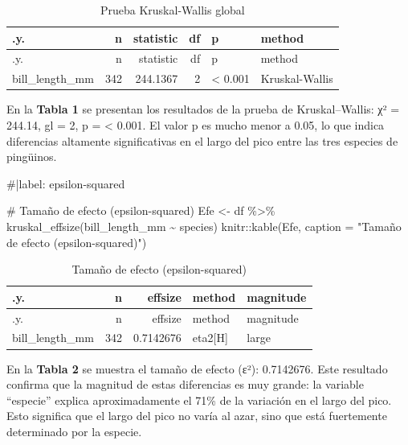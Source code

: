 \documentclass[
  spanish,
  11pt,
  a4paper,
  DIV=11,
  numbers=noendperiod]{scrartcl}
\newenvironment{Shaded}{\begin{snugshade}}{\end{snugshade}}
\newcommand{\AttributeTok}[1]{\textcolor[rgb]{0.40,0.45,0.13}{#1}}
\newcommand{\CommentTok}[1]{\textcolor[rgb]{0.37,0.37,0.37}{#1}}
\newcommand{\FunctionTok}[1]{\textcolor[rgb]{0.28,0.35,0.67}{#1}}
\newcommand{\NormalTok}[1]{\textcolor[rgb]{0.00,0.23,0.31}{#1}}
\newcommand{\OtherTok}[1]{\textcolor[rgb]{0.00,0.23,0.31}{#1}}
\newcommand{\SpecialCharTok}[1]{\textcolor[rgb]{0.37,0.37,0.37}{#1}}
\newcommand{\StringTok}[1]{\textcolor[rgb]{0.13,0.47,0.30}{#1}}
\begin{document}
\begin{longtable}[]{@{}lrrrll@{}}
\caption{Prueba Kruskal-Wallis global}\tabularnewline
\toprule\noalign{}
.y. & n & statistic & df & p & method \\
\midrule\noalign{}
\endfirsthead
\toprule\noalign{}
.y. & n & statistic & df & p & method \\
\midrule\noalign{}
\endhead
\bottomrule\noalign{}
\endlastfoot
bill\_length\_mm & 342 & 244.1367 & 2 & \textless{} 0.001 &
Kruskal-Wallis \\
\end{longtable}

En la \textbf{Tabla 1} se presentan los resultados de la prueba de
Kruskal--Wallis: χ² = 244.14, gl = 2, p = \textless{} 0.001. El valor p
es mucho menor a 0.05, lo que indica diferencias altamente
significativas en el largo del pico entre las tres especies de
pingüinos.

\begin{Shaded}
\begin{Highlighting}[numbers=left,,]
\CommentTok{\#|label: epsilon{-}squared}

\CommentTok{\# Tamaño de efecto (epsilon{-}squared)}
\NormalTok{Efe }\OtherTok{\textless{}{-}}\NormalTok{ df }\SpecialCharTok{\%\textgreater{}\%} \FunctionTok{kruskal\_effsize}\NormalTok{(bill\_length\_mm }\SpecialCharTok{\textasciitilde{}}\NormalTok{ species)}
\NormalTok{knitr}\SpecialCharTok{::}\FunctionTok{kable}\NormalTok{(Efe, }\AttributeTok{caption =} \StringTok{"Tamaño de efecto (epsilon{-}squared)"}\NormalTok{)}
\end{Highlighting}
\end{Shaded}

\begin{longtable}[]{@{}lrrll@{}}
\caption{Tamaño de efecto (epsilon-squared)}\tabularnewline
\toprule\noalign{}
.y. & n & effsize & method & magnitude \\
\midrule\noalign{}
\endfirsthead
\toprule\noalign{}
.y. & n & effsize & method & magnitude \\
\midrule\noalign{}
\endhead
\bottomrule\noalign{}
\endlastfoot
bill\_length\_mm & 342 & 0.7142676 & eta2{[}H{]} & large \\
\end{longtable}

En la \textbf{Tabla 2} se muestra el tamaño de efecto (ε²): 0.7142676.
Este resultado confirma que la magnitud de estas diferencias es muy
grande: la variable ``especie'' explica aproximadamente el 71\% de la
variación en el largo del pico. Esto significa que el largo del pico no
varía al azar, sino que está fuertemente determinado por la especie.
\end{document}
